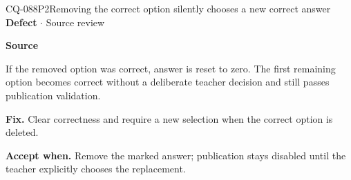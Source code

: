 \begin{finding}{CQ-088}{P2}{Removing the correct option silently chooses a new correct answer}
\textbf{Defect} $\cdot$ Source review\par
\textbf{Source}\quad{}\par
If the removed option was correct, answer is reset to zero. The first remaining option becomes correct without a deliberate teacher decision and still passes publication validation.\par
\textbf{Fix.} Clear correctness and require a new selection when the correct option is deleted.\par
\textbf{Accept when.} Remove the marked answer; publication stays disabled until the teacher explicitly chooses the replacement.
\end{finding}
\clearpage
